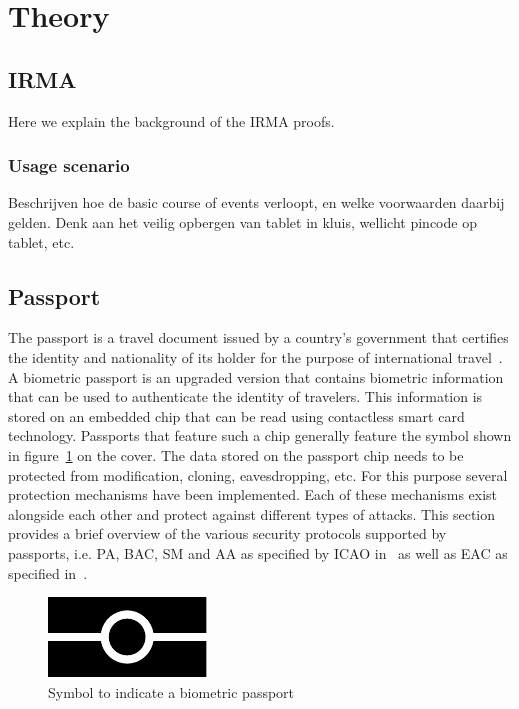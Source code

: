 \section{Theory}
\subsection{IRMA}
Here we explain the background of the IRMA proofs.

\subsubsection{Usage scenario}
Beschrijven hoe de basic course of events verloopt, en welke voorwaarden daarbij gelden. Denk aan het veilig opbergen van tablet in kluis, wellicht pincode op tablet, etc.

\subsection{Passport}
The passport is a travel document issued by a country's government that certifies the identity and nationality of its holder for the purpose of international travel~\cite{passportdefinition}. A biometric passport is an upgraded version that contains biometric information that can be used to authenticate the identity of travelers. This information is stored on an embedded chip that can be read using contactless smart card technology. Passports that feature such a chip generally feature the symbol shown in figure~\ref{fig:biometricslogo} on the cover. The data stored on the passport chip needs to be protected from modification, cloning, eavesdropping, etc. For this purpose several protection mechanisms have been implemented. Each of these mechanisms exist alongside each other and protect against different types of attacks. This section provides a brief overview of the various security protocols supported by passports, i.e. PA, BAC, SM and AA as specified by ICAO in~\cite{icao} as well as EAC as specified in~\cite{bsi}. 

\begin{figure}[htb]
	\centering
		\includegraphics{images/biometrics_logo.pdf}
	\caption{Symbol to indicate a biometric passport}
	\label{fig:biometricslogo}
\end{figure}

